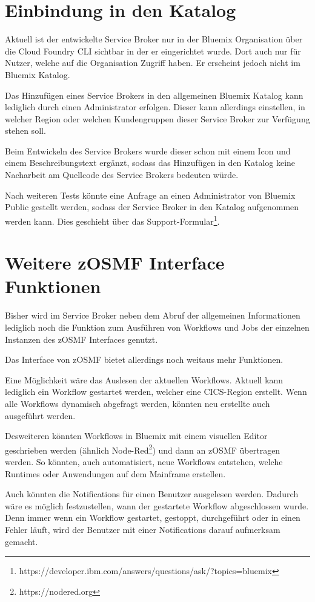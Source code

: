 \section{Einbindung in den Katalog}
Aktuell ist der entwickelte Service Broker nur in der Bluemix Organisation über die Cloud Foundry CLI sichtbar in der er
eingerichtet wurde. Dort auch nur für Nutzer, welche auf die Organisation Zugriff haben. Er erscheint jedoch nicht im
Bluemix Katalog.

Das Hinzufügen eines Service Brokers in den allgemeinen Bluemix Katalog kann lediglich durch einen Administrator erfolgen.
Dieser kann allerdings einstellen, in welcher Region oder welchen Kundengruppen dieser Service Broker zur Verfügung stehen
soll.

Beim Entwickeln des Service Brokers wurde dieser schon mit einem Icon und einem Beschreibungstext ergänzt, sodass das
Hinzufügen in den Katalog keine Nacharbeit am Quellcode des Service Brokers bedeuten würde.

Nach weiteren Tests könnte eine Anfrage an einen Administrator von Bluemix Public gestellt werden, sodass der Service
Broker in den Katalog aufgenommen werden kann. Dies geschieht über das
Support-Formular\footnote{https://developer.ibm.com/answers/questions/ask/?topics=bluemix}.

\section{Weitere zOSMF Interface Funktionen}
Bisher wird im Service Broker neben dem Abruf der allgemeinen Informationen lediglich noch die Funktion zum Ausführen
von Workflows und Jobs der einzelnen Instanzen des zOSMF Interfaces genutzt.

Das Interface von zOSMF bietet allerdings noch weitaus mehr Funktionen.

Eine Möglichkeit wäre das Auslesen der aktuellen Workflows. Aktuell kann lediglich ein Workflow gestartet werden,
welcher eine CICS-Region erstellt. Wenn alle Workflows dynamisch abgefragt werden, könnten neu erstellte auch ausgeführt
werden.

Desweiteren könnten Workflows in Bluemix mit einem visuellen Editor geschrieben werden (ähnlich
Node-Red\footnote{https://nodered.org}) und dann an zOSMF übertragen werden. So könnten, auch automatisiert, neue Workflows
entstehen, welche Runtimes oder Anwendungen auf dem Mainframe erstellen.

Auch könnten die Notifications für einen Benutzer ausgelesen werden. Dadurch wäre es möglich festzustellen, wann der
gestartete Workflow abgeschlossen wurde. Denn immer wenn ein Workflow gestartet, gestoppt, durchgeführt oder in einen
Fehler läuft, wird der Benutzer mit einer Notifications darauf aufmerksam gemacht.

